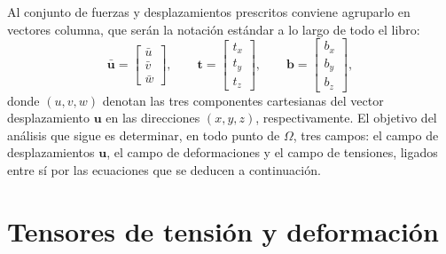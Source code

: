 Al conjunto de fuerzas y desplazamientos prescritos conviene agruparlo en vectores columna, que serán la notación estándar a lo largo de todo el libro:
\[
\bar{\bm u} = \begin{bmatrix} \bar u \\ \bar v \\ \bar w \end{bmatrix}, \qquad
\bm t = \begin{bmatrix} t_x \\ t_y \\ t_z \end{bmatrix}, \qquad
\bm b = \begin{bmatrix} b_x \\ b_y \\ b_z \end{bmatrix},
\]
donde $(u,v,w)$ denotan las tres componentes cartesianas del vector desplazamiento $\bm u$ en las direcciones $(x,y,z)$, respectivamente. El objetivo del análisis que sigue es determinar, en todo punto de $\Omega$, tres campos: el campo de desplazamientos $\bm u$, el campo de deformaciones y el campo de tensiones, ligados entre sí por las ecuaciones que se deducen a continuación.

\section{Tensores de tensión y deformación}
\label{sec:cap02-tensores}

